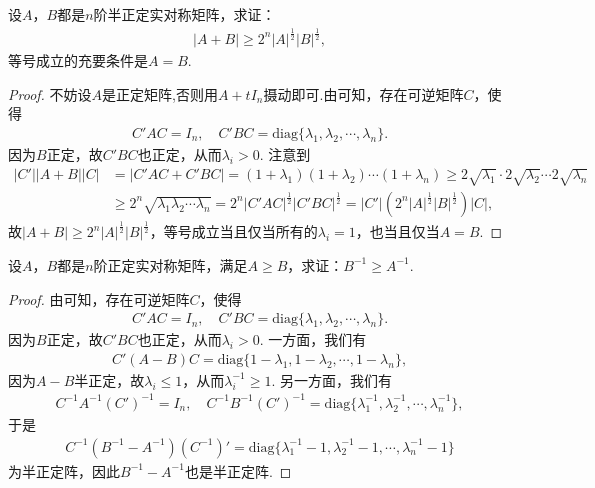 \documentclass[../../main.tex]{subfiles}
\begin{document}
\begin{proposition}\label{proposition:例9.77}
设\(A\)，\(B\)都是\(n\)阶半正定实对称矩阵，求证：
\begin{align*}
\vert A + B\vert\geqslant 2^n\vert A\vert^{\frac{1}{2}}\vert B\vert^{\frac{1}{2}},
\end{align*}
等号成立的充要条件是\(A = B\).
\end{proposition}
\begin{proof}
不妨设$A$是正定矩阵,否则用$A+tI_n$摄动即可.由可知，存在可逆矩阵\(C\)，使得
\begin{align*}
C'AC = I_n,\quad C'BC = \mathrm{diag}\{\lambda_1,\lambda_2,\cdots,\lambda_n\}.
\end{align*}
因为\(B\)正定，故\(C'BC\)也正定，从而\(\lambda_i>0\). 注意到
\begin{align*}
\vert C'\vert\vert A + B\vert\vert C\vert&=\vert C'AC + C'BC\vert=(1 + \lambda_1)(1 + \lambda_2)\cdots(1 + \lambda_n)\geqslant 2\sqrt{\lambda _1}\cdot 2\sqrt{\lambda _2}\cdots 2\sqrt{\lambda _n}\\
&\geqslant 2^n\sqrt{\lambda_1\lambda_2\cdots\lambda_n}=2^n\vert C'AC\vert^{\frac{1}{2}}\vert C'BC\vert^{\frac{1}{2}}=\vert C'\vert(2^n\vert A\vert^{\frac{1}{2}}\vert B\vert^{\frac{1}{2}})\vert C\vert,
\end{align*}
故\(\vert A + B\vert\geqslant 2^n\vert A\vert^{\frac{1}{2}}\vert B\vert^{\frac{1}{2}}\)，等号成立当且仅当所有的\(\lambda_i = 1\)，也当且仅当\(A = B\).

\end{proof}

\begin{example}\label{example:例9.78}
设\(A\)，\(B\)都是\(n\)阶正定实对称矩阵，满足\(A\geqslant  B\)，求证：\(B^{-1}\geqslant  A^{-1}\).
\end{example}
\begin{proof}
由可知，存在可逆矩阵\(C\)，使得
\begin{align*}
C'AC = I_n,\quad C'BC = \mathrm{diag}\{\lambda_1,\lambda_2,\cdots,\lambda_n\}.
\end{align*}
因为\(B\)正定，故\(C'BC\)也正定，从而\(\lambda_i>0\). 一方面，我们有
\begin{align*}
C'(A - B)C = \mathrm{diag}\{1 - \lambda_1,1 - \lambda_2,\cdots,1 - \lambda_n\},
\end{align*}
因为\(A - B\)半正定，故\(\lambda_i\leqslant 1\)，从而\(\lambda_i^{-1}\geqslant 1\). 另一方面，我们有
\begin{align*}
C^{-1}A^{-1}(C')^{-1} = I_n,\quad C^{-1}B^{-1}(C')^{-1} = \mathrm{diag}\{\lambda_1^{-1},\lambda_2^{-1},\cdots,\lambda_n^{-1}\},
\end{align*}
于是
\begin{align*}
C^{-1}(B^{-1} - A^{-1})(C^{-1})' = \mathrm{diag}\{\lambda_1^{-1} - 1,\lambda_2^{-1} - 1,\cdots,\lambda_n^{-1} - 1\}
\end{align*}
为半正定阵，因此\(B^{-1} - A^{-1}\)也是半正定阵.

\end{proof}
\end{document}

